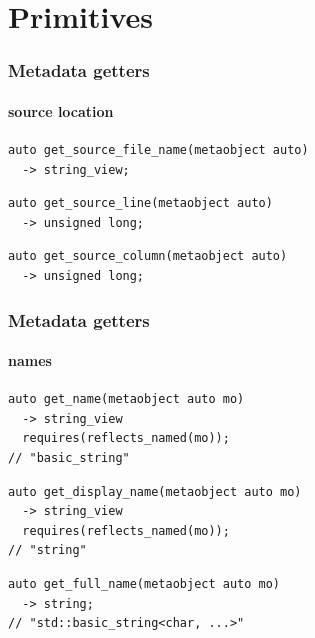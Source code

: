\documentclass[compress,table,xcolor=table]{beamer}
\begin{document}
\section{Primitives}
\begin{frame}[fragile]
  \frametitle{Metadata getters}
  \framesubtitle{source location}
  \begin{lstlisting}[language=c++2x]
auto get_source_file_name(metaobject auto)
  -> string_view;
  \end{lstlisting}
  \vfill
  \begin{lstlisting}[language=c++2x]
auto get_source_line(metaobject auto)
  -> unsigned long;
  \end{lstlisting}
  \vfill
  \begin{lstlisting}[language=c++2x]
auto get_source_column(metaobject auto)
  -> unsigned long;
  \end{lstlisting}
\end{frame}
\begin{frame}[fragile]
  \frametitle{Metadata getters}
  \framesubtitle{names}
  \begin{lstlisting}[language=c++2x]
auto get_name(metaobject auto mo)
  -> string_view
  requires(reflects_named(mo));
// "basic_string"
  \end{lstlisting}
  \vfill
  \begin{lstlisting}[language=c++2x]
auto get_display_name(metaobject auto mo)
  -> string_view
  requires(reflects_named(mo));
// "string"
  \end{lstlisting}
  \vfill
  \begin{lstlisting}[language=c++2x]
auto get_full_name(metaobject auto mo)
  -> string;
// "std::basic_string<char, ...>"
  \end{lstlisting}
\end{frame}
\end{document}
